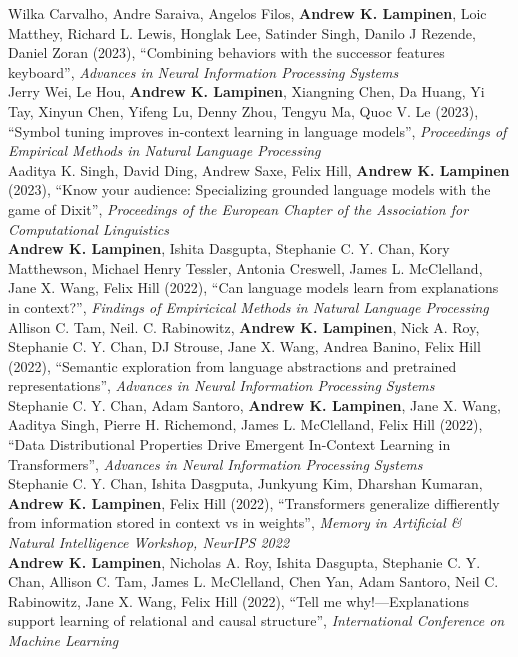 \documentclass[margin]{res}
\begin{document}
\begin{resume}
{Wilka Carvalho, Andre Saraiva, Angelos Filos, \textbf{Andrew K. Lampinen}, Loic Matthey, Richard L. Lewis, Honglak Lee, Satinder Singh, Danilo J Rezende, Daniel Zoran (2023), {``Combining behaviors with the successor features keyboard''}, \textit{Advances in Neural Information Processing Systems} \\[3pt]
Jerry Wei, Le Hou, \textbf{Andrew K. Lampinen}, Xiangning Chen, Da Huang, Yi Tay, Xinyun Chen, Yifeng Lu, Denny Zhou, Tengyu Ma, Quoc V. Le (2023), {``Symbol tuning improves in-context learning in language models'',} \textit{Proceedings of Empirical Methods in Natural Language Processing} \\[3pt]
Aaditya K. Singh, David Ding, Andrew Saxe, Felix Hill, \textbf{Andrew K. Lampinen} (2023), {``Know your audience: Specializing grounded language models with the game of Dixit'',} \textit{Proceedings of the European Chapter of the Association for Computational Linguistics} \\[3pt]
\textbf{Andrew K. Lampinen}, Ishita Dasgupta, Stephanie C. Y. Chan, Kory Matthewson, Michael Henry Tessler, Antonia Creswell, James L. McClelland, Jane X. Wang, Felix Hill (2022), {``Can language models learn from explanations in context?'',} \textit{Findings of Empiricical Methods in Natural Language Processing} \\[3pt] 
Allison C. Tam,  Neil. C. Rabinowitz, \textbf{Andrew K. Lampinen}, Nick A. Roy, Stephanie C. Y. Chan, DJ Strouse, Jane X. Wang, Andrea Banino, Felix Hill (2022), {``Semantic exploration from language abstractions and pretrained representations'',} \textit{Advances in Neural Information Processing Systems} \\[3pt] 
Stephanie C. Y. Chan, Adam Santoro, \textbf{Andrew K. Lampinen}, Jane X. Wang, Aaditya Singh, Pierre H. Richemond, James L. McClelland, Felix Hill (2022), {``Data Distributional Properties Drive Emergent In-Context Learning in Transformers'',} \textit{Advances in Neural Information Processing Systems} \\[3pt] 
Stephanie C. Y. Chan, Ishita Dasgputa, Junkyung Kim, Dharshan Kumaran, \textbf{Andrew K. Lampinen}, Felix Hill (2022), {``Transformers generalize diffierently from information stored in context vs in weights'',} \textit{Memory in Artificial \& Natural Intelligence Workshop, NeurIPS 2022} \\[3pt]
\textbf{Andrew K. Lampinen}, Nicholas A. Roy, Ishita Dasgupta, Stephanie C. Y. Chan, Allison C. Tam, James L. McClelland, Chen Yan, Adam Santoro, Neil C. Rabinowitz, Jane X. Wang, Felix Hill (2022), {``Tell me why!---Explanations support learning of relational and causal structure'',} \textit{International Conference on Machine Learning} \\[3pt] 
}
\end{resume}
\end{document}
